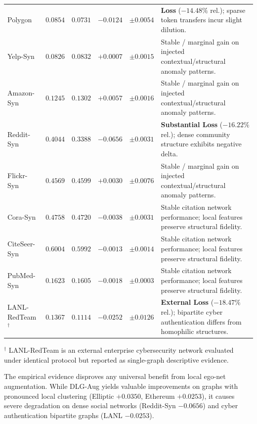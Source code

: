 \documentclass[11pt,a4paper]{article}
\begin{document}
\begin{table}[htbp]
\begin{tabularx}{\textwidth}{lrrrr>{\raggedright\arraybackslash}X}
Polygon & $0.0854$ & $0.0731$ & $-0.0124$ & $\pm 0.0054$ & \textbf{Loss} ($-14.48\%$ rel.); sparse token transfers incur slight dilution. \\
Yelp-Syn & $0.0826$ & $0.0832$ & $+0.0007$ & $\pm 0.0015$ & Stable / marginal gain on injected contextual/structural anomaly patterns. \\
Amazon-Syn & $0.1245$ & $0.1302$ & $+0.0057$ & $\pm 0.0016$ & Stable / marginal gain on injected contextual/structural anomaly patterns. \\
Reddit-Syn & $0.4044$ & $0.3388$ & $\mathbf{-0.0656}$ & $\pm 0.0031$ & \textbf{Substantial Loss} ($-16.22\%$ rel.); dense community structure exhibits negative delta. \\
Flickr-Syn & $0.4569$ & $0.4599$ & $+0.0030$ & $\pm 0.0076$ & Stable / marginal gain on injected contextual/structural anomaly patterns. \\
Cora-Syn & $0.4758$ & $0.4720$ & $-0.0038$ & $\pm 0.0031$ & Stable citation network performance; local features preserve structural fidelity. \\
CiteSeer-Syn & $0.6004$ & $0.5992$ & $-0.0013$ & $\pm 0.0014$ & Stable citation network performance; local features preserve structural fidelity. \\
PubMed-Syn & $0.1623$ & $0.1605$ & $-0.0018$ & $\pm 0.0003$ & Stable citation network performance; local features preserve structural fidelity. \\
LANL-RedTeam$^{\dagger}$ & $0.1367$ & $0.1114$ & $-0.0252$ & $\pm 0.0126$ & \textbf{External Loss} ($-18.47\%$ rel.); bipartite cyber authentication differs from homophilic structures. \\
\bottomrule
\end{tabularx}
\begin{tablenotes}\footnotesize
\item $^{\dagger}$ LANL-RedTeam is an external enterprise cybersecurity network evaluated under identical protocol but reported as single-graph descriptive evidence.
\end{tablenotes}
\end{table}


The empirical evidence disproves any universal benefit from local ego-net augmentation. While DLG-Aug yields valuable improvements on graphs with pronounced local clustering (Elliptic $+0.0350$, Ethereum $+0.0253$), it causes severe degradation on dense social networks (Reddit-Syn $-0.0656$) and cyber authentication bipartite graphs (LANL $-0.0253$).
\end{document}
